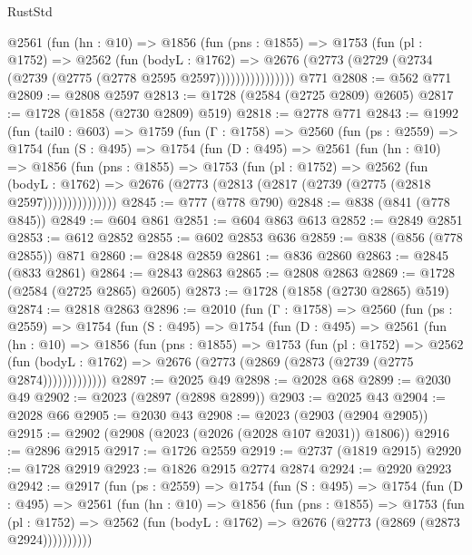 \begin{lexlean}{RustStd}
\begin{coremodule}
              @2561
                (fun (hn : @10) =>
                @1856
                  (fun (pns : @1855) =>
                  @1753
                    (fun (pl : @1752) =>
                    @2562
                      (fun (bodyL : @1762) =>
                      @2676 (@2773 (@2729 (@2734 (@2739 (@2775 (@2778 @2595 @2597))))))))))))))))
    @771
@2808 := @562 @771
@2809 := @2808 @2597
@2813 := @1728 (@2584 (@2725 @2809) @2605)
@2817 := @1728 (@1858 (@2730 @2809) @519)
@2818 := @2778 @771
@2843 := @1992
    (fun (tail0 : @603) =>
    @1759
      (fun (Γ : @1758) =>
      @2560
        (fun (ps : @2559) =>
        @1754
          (fun (S : @495) =>
          @1754
            (fun (D : @495) =>
            @2561
              (fun (hn : @10) =>
              @1856
                (fun (pns : @1855) =>
                @1753
                  (fun (pl : @1752) =>
                  @2562
                    (fun (bodyL : @1762) =>
                    @2676 (@2773 (@2813 (@2817 (@2739 (@2775 (@2818 @2597)))))))))))))))
@2845 := @777 (@778 @790)
@2848 := @838 (@841 (@778 @845))
@2849 := @604 @861
@2851 := @604 @863 @613
@2852 := @2849 @2851
@2853 := @612 @2852
@2855 := @602 @2853 @636
@2859 := @838 (@856 (@778 @2855)) @871
@2860 := @2848 @2859
@2861 := @836 @2860
@2863 := @2845 (@833 @2861)
@2864 := @2843 @2863
@2865 := @2808 @2863
@2869 := @1728 (@2584 (@2725 @2865) @2605)
@2873 := @1728 (@1858 (@2730 @2865) @519)
@2874 := @2818 @2863
@2896 := @2010
    (fun (Γ : @1758) =>
    @2560
      (fun (ps : @2559) =>
      @1754
        (fun (S : @495) =>
        @1754
          (fun (D : @495) =>
          @2561
            (fun (hn : @10) =>
            @1856
              (fun (pns : @1855) =>
              @1753
                (fun (pl : @1752) =>
                @2562
                  (fun (bodyL : @1762) =>
                  @2676 (@2773 (@2869 (@2873 (@2739 (@2775 @2874)))))))))))))
@2897 := @2025 @49
@2898 := @2028 @68
@2899 := @2030 @49
@2902 := @2023 (@2897 (@2898 @2899))
@2903 := @2025 @43
@2904 := @2028 @66
@2905 := @2030 @43
@2908 := @2023 (@2903 (@2904 @2905))
@2915 := @2902 (@2908 (@2023 (@2026 (@2028 @107 @2031)) @1806))
@2916 := @2896 @2915
@2917 := @1726 @2559
@2919 := @2737 (@1819 @2915)
@2920 := @1728 @2919
@2923 := @1826 @2915 @2774 @2874
@2924 := @2920 @2923
@2942 := @2917
    (fun (ps : @2559) =>
    @1754
      (fun (S : @495) =>
      @1754
        (fun (D : @495) =>
        @2561
          (fun (hn : @10) =>
          @1856
            (fun (pns : @1855) =>
            @1753
              (fun (pl : @1752) =>
              @2562 (fun (bodyL : @1762) => @2676 (@2773 (@2869 (@2873 @2924))))))))))

\end{coremodule}
\end{lexlean}
